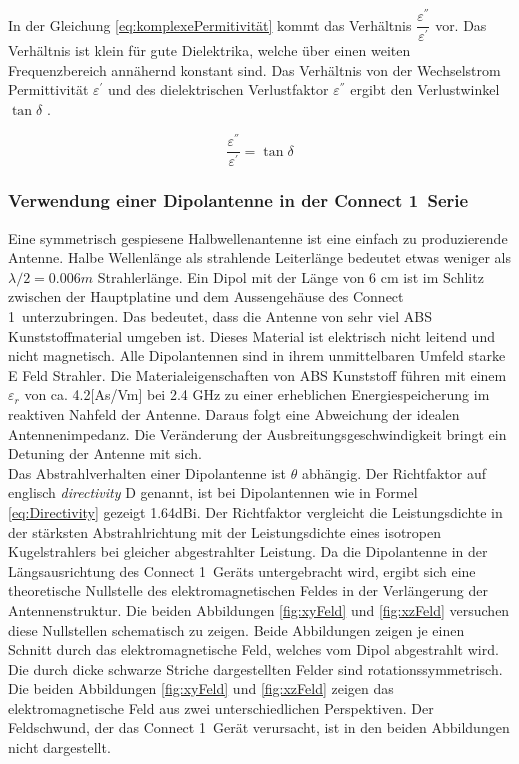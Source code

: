In der Gleichung \ref{eq:komplexePermitivität} kommt das Verhältnis $\dfrac{\varepsilon^{''}}{\varepsilon^{'}}$ vor. Das Verhältnis ist klein für gute Dielektrika, welche über einen weiten Frequenzbereich annähernd konstant sind. Das Verhältnis von der Wechselstrom Permittivität $\varepsilon^{'}$ und des dielektrischen Verlustfaktor $\varepsilon^{''}$ ergibt den Verlustwinkel $\tan\delta$ \cite{elliott1981antenna}. 

\begin{equation} \label{eq:VerlustwinkelEpsilonPermitivität}
\dfrac{\varepsilon^{''}}{\varepsilon^{'}}=\tan\delta
\end{equation}


\subsubsection{Verwendung einer Dipolantenne in der  \glqq Connect 1\grqq \  Serie}
Eine symmetrisch gespiesene Halbwellenantenne  ist eine einfach zu produzierende Antenne. Halbe Wellenlänge als strahlende Leiterlänge bedeutet etwas weniger als $\lambda/2=0.006m$ Strahlerlänge. Ein Dipol mit der Länge von 6 cm ist im Schlitz zwischen der Hauptplatine und dem Aussengehäuse des \glqq Connect 1\grqq \ unterzubringen. 
Das bedeutet, dass die Antenne von sehr viel ABS Kunststoffmaterial umgeben ist. Dieses Material ist elektrisch nicht leitend und nicht magnetisch. Alle Dipolantennen sind in ihrem unmittelbaren Umfeld starke E Feld Strahler.  Die Materialeigenschaften von ABS Kunststoff führen mit einem  $\varepsilon_r$ von ca. 4.2[As/Vm] bei 2.4 GHz zu einer erheblichen Energiespeicherung im reaktiven Nahfeld der Antenne. Daraus folgt eine  Abweichung der idealen Antennenimpedanz. Die Veränderung der Ausbreitungsgeschwindigkeit  bringt  ein Detuning der Antenne mit sich.\\

Das Abstrahlverhalten einer Dipolantenne ist $\theta$ abhängig. Der Richtfaktor  auf englisch \textit{directivity} D genannt, ist bei Dipolantennen wie in Formel \ref{eq:Directivity} gezeigt   1.64dBi.  Der Richtfaktor vergleicht die Leistungsdichte in der stärksten Abstrahlrichtung mit der Leistungsdichte eines isotropen Kugelstrahlers  bei gleicher abgestrahlter Leistung. Da die Dipolantenne in der Längsausrichtung des \glqq Connect 1\grqq \ Geräts untergebracht wird, ergibt sich eine theoretische Nullstelle des elektromagnetischen Feldes in der Verlängerung der Antennenstruktur. Die beiden Abbildungen \ref{fig:xyFeld} und \ref{fig:xzFeld} versuchen diese Nullstellen schematisch zu zeigen. Beide Abbildungen zeigen je einen Schnitt durch das elektromagnetische Feld, welches vom Dipol abgestrahlt wird. Die durch dicke schwarze Striche dargestellten Felder sind rotationssymmetrisch. Die beiden Abbildungen \ref{fig:xyFeld} und \ref{fig:xzFeld} zeigen das elektromagnetische Feld aus zwei unterschiedlichen Perspektiven. Der Feldschwund, der  das \glqq Connect 1\grqq \ Gerät verursacht, ist in den beiden Abbildungen nicht dargestellt.

